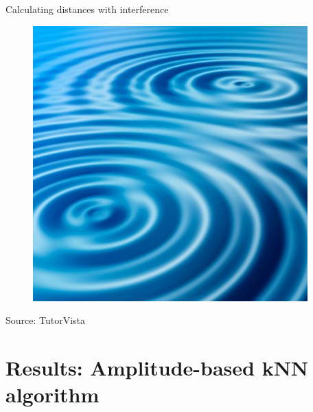 \documentclass[10pt]{beamer}
\begin{document}
{
\begin{frame}[fragile]{Calculating distances with interference}

\begin{figure}[ht]
\includegraphics[scale=0.5]{wave-interference.png}
\end{figure}
\centering
\tiny{Source: TutorVista}

\end{frame}
}

\section{Results: Amplitude-based kNN algorithm}
\end{document}
